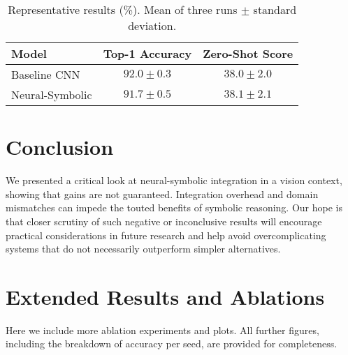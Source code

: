 \documentclass{article}
\begin{document}
\begin{table}[t]
    \centering
    \caption{Representative results (\%). Mean of three runs $\pm$ standard deviation.}
    \label{tab:results}
    \begin{tabular}{lcc}
    \toprule
    \textbf{Model} & \textbf{Top-1 Accuracy} & \textbf{Zero-Shot Score}\\
    \midrule
    Baseline CNN & $92.0 \pm 0.3$ & $38.0 \pm 2.0$ \\
    Neural-Symbolic & $91.7 \pm 0.5$ & $38.1 \pm 2.1$ \\
    \bottomrule
    \end{tabular}
\end{table}

\section{Conclusion}
We presented a critical look at neural-symbolic integration in a vision context, showing that gains are not guaranteed. Integration overhead and domain mismatches can impede the touted benefits of symbolic reasoning. Our hope is that closer scrutiny of such negative or inconclusive results will encourage practical considerations in future research and help avoid overcomplicating systems that do not necessarily outperform simpler alternatives.

\appendix
\section{Extended Results and Ablations}
Here we include more ablation experiments and plots. All further figures, including the breakdown of accuracy per seed, are provided for completeness.



\end{document}
